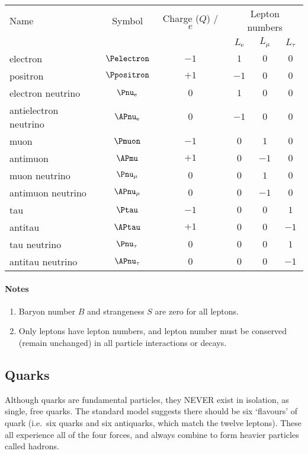 \documentclass[a4paper,12pt]{article}
\begin{document}
\noindent \begin{tabular}{lccccc}
\hline
\hline
Name & Symbol & Charge ($Q$) / $e$ & \multicolumn{3}{c}{Lepton numbers}\\
&&&$L_{\mathrm{e}}$&$L_{\mu}$&$L_{\tau}$\\
\cline{4-6}
\hline
electron & $\Pelectron$ & $-1$ & $1$ & $0$ & $0$\\
positron & $\Ppositron$ & $+1$ & $-1$ & $0$ & $0$\\
electron neutrino & $\Pnu_{\mathrm{e}}$ & $0$ & $1$ & $0$ & $0$\\
antielectron neutrino & $\APnu_{\mathrm{e}}$ & $0$ & $-1$ & $0$ & $0$\\
\hline
muon & $\Pmuon$ & $-1$ & $0$ & $1$ & $0$\\
antimuon & $\APmu$ & $+1$ & $0$ & $-1$ & $0$\\
muon neutrino & $\Pnu_{\mu}$ & $0$ & $0$ & $1$ & $0$\\
antimuon neutrino & $\APnu_{\mu}$ & $0$ & $0$ & $-1$ & $0$\\
\hline
tau & $\Ptau$ & $-1$ & $0$ & $0$ & $1$\\
antitau & $\APtau$ & $+1$ & $0$ & $0$ & $-1$\\
tau neutrino & $\Pnu_{\tau}$ & $0$ & $0$ & $0$ & $1$\\
antitau neutrino & $\APnu_{\tau}$ & $0$ & $0$ & $0$ & $-1$\\
\hline
\hline
\end{tabular}

\paragraph{Notes}\begin{enumerate}
\item Baryon number $B$ and strangeness $S$ are zero for all leptons.
\item Only leptons have lepton numbers, and lepton number must be conserved (remain unchanged) in all particle interactions or decays.
\end{enumerate}

\subsection{Quarks}
Although quarks are fundamental particles, they NEVER exist in isolation, as single, free quarks.  The standard model suggests there should be six `flavours' of quark (i.e.\ six quarks and six antiquarks, which match the twelve leptons).  These all experience all of the four forces, and always combine to form heavier particles called hadrons.
\end{document}
